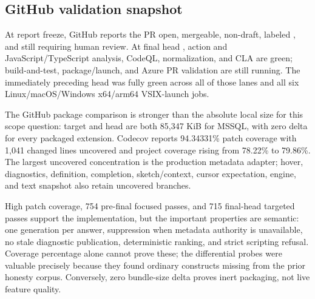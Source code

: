 \documentclass[11pt]{article}
\newcommand{\code}[1]{\texttt{\detokenize{#1}}}
\begin{document}
\subsection{GitHub validation snapshot}

At report freeze, GitHub reports the PR open, mergeable, non-draft, labeled \code{Automated Review}, and still requiring human review. At final head \code{2bc5811e3}, action and JavaScript/TypeScript analysis, CodeQL, normalization, and CLA are green; build-and-test, package/launch, and Azure PR validation are still running. The immediately preceding head was fully green across all of those lanes and all six Linux/macOS/Windows x64/arm64 VSIX-launch jobs.

The GitHub package comparison is stronger than the absolute local size for this scope question: target and head are both 85,347 KiB for MSSQL, with zero delta for every packaged extension. Codecov reports 94.34331\% patch coverage with 1,041 changed lines uncovered and project coverage rising from 78.22\% to 79.86\%. The largest uncovered concentration is the production metadata adapter; hover, diagnostics, definition, completion, sketch/context, cursor expectation, engine, and text snapshot also retain uncovered branches.

\begin{evidencebox}
High patch coverage, 754 pre-final focused passes, and 715 final-head targeted passes support the implementation, but the important properties are semantic: one generation per answer, suppression when metadata authority is unavailable, no stale diagnostic publication, deterministic ranking, and strict scripting refusal. Coverage percentage alone cannot prove these; the differential probes were valuable precisely because they found ordinary constructs missing from the prior honesty corpus. Conversely, zero bundle-size delta proves inert packaging, not live feature quality.
\end{evidencebox}
\end{document}

